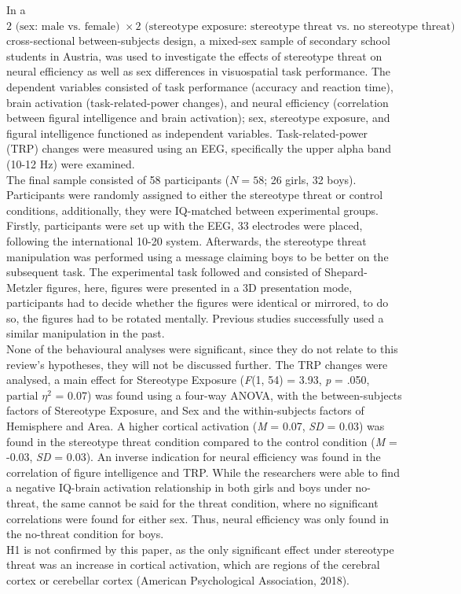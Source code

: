 \documentclass[
  stu,floatsintext]{apa7}
\begin{document}
In a \(2 \text{ (sex: male vs. female) } \times 2 \text{ (stereotype exposure: stereotype threat vs. no stereotype threat) }\) cross-sectional between-subjects design, a mixed-sex sample of secondary school students in Austria, was used to investigate the effects of stereotype threat on neural efficiency as well as sex differences in visuospatial task performance.
The dependent variables consisted of task performance (accuracy and reaction time), brain activation (task-related-power changes), and neural efficiency (correlation between figural intelligence and brain activation); sex, stereotype exposure, and figural intelligence functioned as independent variables.
Task-related-power (TRP) changes were measured using an EEG, specifically the upper alpha band (10-12 Hz) were examined.\\
The final sample consisted of 58 participants (\(N = 58\); 26 girls, 32 boys).
Participants were randomly assigned to either the stereotype threat or control conditions, additionally, they were IQ-matched between experimental groups.\\
Firstly, participants were set up with the EEG, 33 electrodes were placed, following the international 10-20 system.
Afterwards, the stereotype threat manipulation was performed using a message claiming boys to be better on the subsequent task.
The experimental task followed and consisted of Shepard-Metzler figures, here, figures were presented in a 3D presentation mode, participants had to decide whether the figures were identical or mirrored, to do so, the figures had to be rotated mentally.
Previous studies successfully used a similar manipulation in the past.\\
None of the behavioural analyses were significant, since they do not relate to this review's hypotheses, they will not be discussed further.
The TRP changes were analysed, a main effect for Stereotype Exposure (\emph{F}(1, 54) = 3.93, \emph{p} = .050, \(\text{partial }\eta^{2}\) = 0.07) was found using a four-way ANOVA, with the between-subjects factors of Stereotype Exposure, and Sex and the within-subjects factors of Hemisphere and Area.
A higher cortical activation (\emph{M} = 0.07, \emph{SD} = 0.03) was found in the stereotype threat condition compared to the control condition (\emph{M} = -0.03, \emph{SD} = 0.03).
An inverse indication for neural efficiency was found in the correlation of figure intelligence and TRP.
While the researchers were able to find a negative IQ-brain activation relationship in both girls and boys under no-threat, the same cannot be said for the threat condition, where no significant correlations were found for either sex.
Thus, neural efficiency was only found in the no-threat condition for boys.\\
H1 is not confirmed by this paper, as the only significant effect under stereotype threat was an increase in cortical activation, which are regions of the cerebral cortex or cerebellar cortex (American Psychological Association, 2018).
\end{document}

